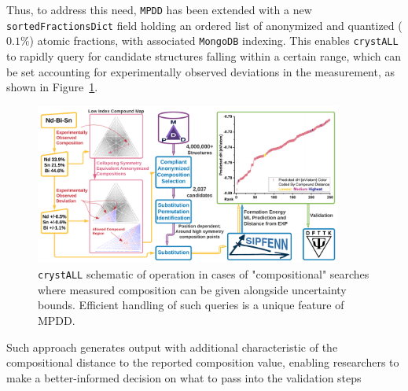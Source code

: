 Thus, to address this need, \texttt{MPDD} has been extended with a new \texttt{sortedFractionsDict} field holding an ordered list of anonymized and quantized ($0.1\%$) atomic fractions, with associated \texttt{MongoDB} indexing. This enables \texttt{crystALL} to rapidly query for candidate structures falling within a certain range, which can be set accounting for experimentally observed deviations in the measurement, as shown in Figure~\ref{fig:crystallcomposition}.

\begin{figure}[h]
    \centering
    \includegraphics[width=0.9\textwidth]{crystall/crystALL_composition_diagram_V3.png}
    \caption{\texttt{crystALL} schematic of operation in cases of "compositional" searches where measured composition can be given alongside uncertainty bounds. Efficient handling of such queries is a unique feature of MPDD.}
    \label{fig:crystallcomposition}
\end{figure}

Such approach generates output with additional characteristic of the compositional distance to the reported composition value, enabling researchers to make a better-informed decision on what to pass into the validation steps

% 


\printbibliography[heading=subbibintoc]